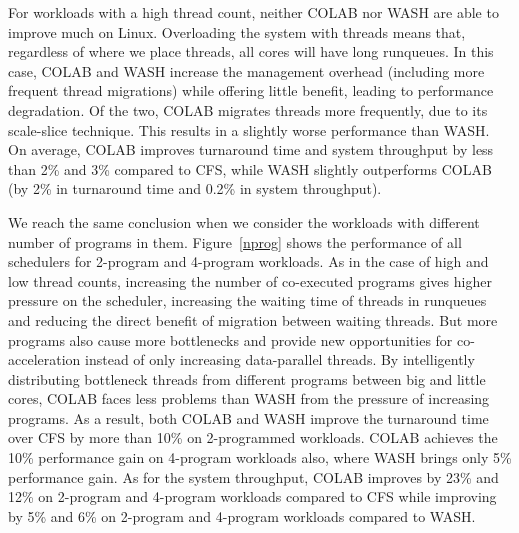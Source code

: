 For workloads with a high thread count, neither COLAB nor WASH are able to improve much on Linux. Overloading the system with threads means that, regardless of where we place threads, all cores will have long runqueues. In this case, COLAB and WASH increase the management overhead (including more frequent thread migrations) while offering little benefit, leading to performance degradation. Of the two, COLAB migrates threads more frequently, due to its scale-slice technique. This results in a slightly worse performance than WASH. On average, COLAB improves turnaround time and system throughput by less than 2\% and 3\% compared to CFS, while WASH slightly outperforms COLAB (by 2\% in turnaround time and 0.2\% in system throughput).

We reach the same conclusion when we consider the workloads with different number of programs in them. Figure~\ref{nprog} shows the performance of all schedulers for 2-program and 4-program workloads. As in the case of high and low thread counts, increasing the number of co-executed programs gives higher pressure on the scheduler, increasing the waiting time of threads in runqueues and reducing the direct benefit of migration between waiting threads. But more programs also cause more bottlenecks and provide new opportunities for co-acceleration instead of only increasing data-parallel threads. 
By intelligently distributing bottleneck threads from different programs between big and little cores, COLAB faces less problems than WASH from the pressure of increasing programs. 
%
As a result, both COLAB and WASH improve the turnaround time over CFS by more than 10\% on 2-programmed workloads. COLAB achieves the 10\% performance gain on 4-program workloads also, where WASH brings only 5\% performance gain. As for the system throughput, COLAB improves by 23\% and 12\% on 2-program and 4-program workloads compared to CFS while improving by 5\% and 6\% on 2-program and 4-program workloads compared to WASH.




